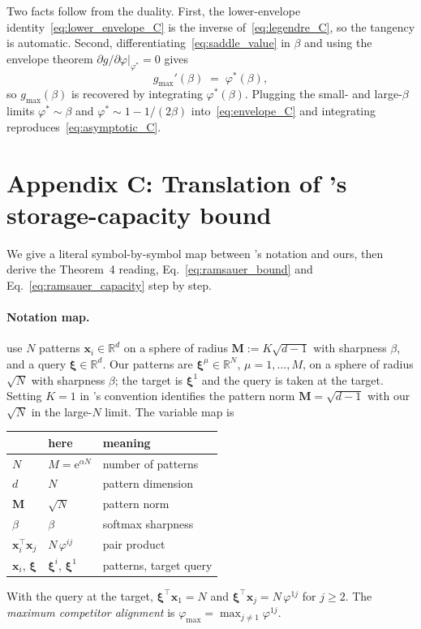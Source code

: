 \documentclass[letterpaper]{article} %
\newcommand{\bxi}{\boldsymbol{\xi}}
\newcommand{\e}{{\mathrm{e}}}
\newcommand{\Bnet}{\beta}
\newcommand{\p}{\partial}
\begin{document}
Two facts follow from the duality.  First, the lower-envelope
identity~\eqref{eq:lower_envelope_C} is the inverse
of~\eqref{eq:legendre_C}, so the tangency is automatic.  Second,
differentiating~\eqref{eq:saddle_value} in $\Bnet$ and using the
envelope theorem $\p g/\p\varphi|_{\varphi^*} = 0$ gives
\begin{equation}
g_{\max}'(\Bnet) \;=\; \varphi^*(\Bnet),
\label{eq:envelope_C}
\end{equation}
so $g_{\max}(\Bnet)$ is recovered by integrating $\varphi^*(\Bnet)$.
Plugging the small- and large-$\Bnet$ limits $\varphi^* \sim \Bnet$
and $\varphi^* \sim 1 - 1/(2\Bnet)$ into~\eqref{eq:envelope_C} and
integrating reproduces~\eqref{eq:asymptotic_C}.


\section{Appendix C: Translation of \citeauthor{ramsauer2021hopfield}'s storage-capacity bound}
\label{sec:appendix_ramsauer}

We give a literal symbol-by-symbol map between
\citeauthor{ramsauer2021hopfield}'s notation and ours, then derive
the Theorem~4 reading, Eq.~\eqref{eq:ramsauer_bound} and
Eq.~\eqref{eq:ramsauer_capacity} step by step.

\paragraph{Notation map.}
\citeauthor{ramsauer2021hopfield} use $N$ patterns
$\bm x_i \in \mathbb R^d$ on a sphere of radius
$\mathbf M := K\sqrt{d-1}$ with sharpness $\beta$, and a query
$\bm \xi \in \mathbb R^d$.  Our patterns are
$\bxi^\mu \in \mathbb R^N$, $\mu = 1, \dots, M$, on a sphere of
radius $\sqrt N$ with sharpness $\Bnet$; the target is $\bxi^1$ and
the query is taken at the target.  Setting $K = 1$ in
\citeauthor{ramsauer2021hopfield}'s convention identifies the
pattern norm $\mathbf M = \sqrt{d-1}$ with our $\sqrt N$ in the
large-$N$ limit.  The variable map is
\begin{center}
\begin{tabular}{lll}
\hline
\citeauthor{ramsauer2021hopfield} & here & meaning \\
\hline
$N$ & $M = \e^{\alpha N}$ & number of patterns \\
$d$ & $N$ & pattern dimension \\
$\mathbf M$ & $\sqrt N$ & pattern norm \\
$\beta$ & $\Bnet$ & softmax sharpness \\
$\bm x_i^\top \bm x_j$ & $N\,\varphi^{ij}$ & pair product \\
$\bm x_i$, $\bm \xi$ & $\bxi^i$, $\bxi^1$ & patterns, target query \\
\hline
\end{tabular}
\end{center}
With the query at the target, $\bm \xi^\top \bm x_1 = N$ and
$\bm \xi^\top \bm x_j = N\,\varphi^{1j}$ for $j \geq 2$.  The
\emph{maximum competitor alignment} is
$\varphi_{\max} = \max_{j \neq 1}\varphi^{1j}$.
\end{document}

